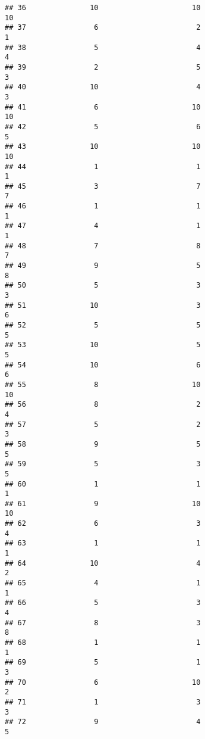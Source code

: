 \documentclass[
]{article}
\begin{document}
\begin{verbatim}
## 36               10                      10                       10
## 37                6                       2                        1
## 38                5                       4                        4
## 39                2                       5                        3
## 40               10                       4                        3
## 41                6                      10                       10
## 42                5                       6                        5
## 43               10                      10                       10
## 44                1                       1                        1
## 45                3                       7                        7
## 46                1                       1                        1
## 47                4                       1                        1
## 48                7                       8                        7
## 49                9                       5                        8
## 50                5                       3                        3
## 51               10                       3                        6
## 52                5                       5                        5
## 53               10                       5                        5
## 54               10                       6                        6
## 55                8                      10                       10
## 56                8                       2                        4
## 57                5                       2                        3
## 58                9                       5                        5
## 59                5                       3                        5
## 60                1                       1                        1
## 61                9                      10                       10
## 62                6                       3                        4
## 63                1                       1                        1
## 64               10                       4                        2
## 65                4                       1                        1
## 66                5                       3                        4
## 67                8                       3                        8
## 68                1                       1                        1
## 69                5                       1                        3
## 70                6                      10                        2
## 71                1                       3                        3
## 72                9                       4                        5

\end{verbatim}
\end{document}
